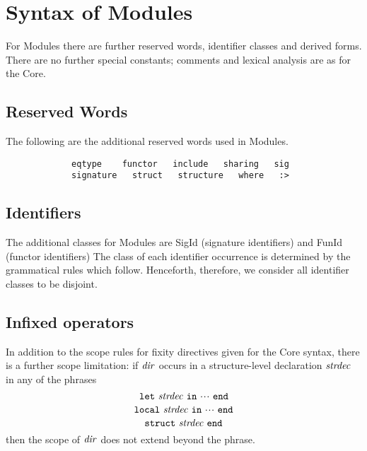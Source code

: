 \section{Syntax of Modules}
\label{syn-mod-sec}
For Modules there are further reserved words, identifier classes and derived
forms. There are no further special constants; 
comments and lexical analysis are as for the Core.


\subsection{Reserved Words}
The following are the additional reserved words used in Modules.
\begin{verbatim}
             eqtype    functor   include   sharing   sig
             signature   struct   structure   where   :>
\end{verbatim}
\subsection{Identifiers}
\label{syn-mod-identifiers-sec}
The additional  classes for Modules are SigId (signature identifiers)
and FunId (functor identifiers)  The class of each identifier occurrence
is determined by the grammatical rules which follow.  
Henceforth, therefore,
we consider all identifier classes to be disjoint.

\subsection{Infixed operators}
\label{infixopmod.sec}
In addition to the scope rules for fixity directives given for the Core syntax,
there is a further scope limitation:
if ${\it dir}$ occurs in a structure-level declaration ${\it strdec}$ in any of the 
phrases
\[ \LET\ \strdec\ \IN\ \cdots\ \END \]
\[ \LOCAL\ \strdec\ \IN\ \cdots\ \END \]
\[ \STRUCT\ \strdec\ \END \]
then the scope of ${\it dir}$ does not extend beyond the phrase.

